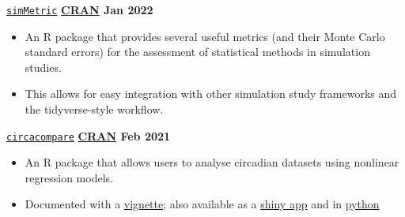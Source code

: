 \texttt{\href{https://github.com/RWParsons/simMetric}{simMetric}} \hfill \textbf{\href{https://cran.r-project.org/package=simMetric}{CRAN}  Jan 2022} \par
\begin{itemize}
    \item An R package that provides several useful metrics (and their Monte Carlo standard errors) for the assessment of statistical methods in simulation studies.
    \item This allows for easy integration with other simulation study frameworks and the tidyverse-style workflow.
\end{itemize}

\texttt{\href{https://github.com/RWParsons/circacompare}{circacompare}} \hfill \textbf{\href{https://cran.r-project.org/package=circacompare}{CRAN} Feb 2021} \par
\begin{itemize}
    \item An R package that allows users to analyse circadian datasets using nonlinear regression models.
    \item Documented with a \href{https://cran.r-project.org/web/packages/circacompare/vignettes/circacompare-vignette.html}{vignette}; also available as a \href{https://rwparsons.shinyapps.io/circacompare/}{shiny app} and in \href{https://github.com/RWParsons/circacompare_py}{python}
\end{itemize}